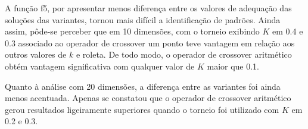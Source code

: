 A função \gls{f5}, por apresentar menos diferença entre os valores de adequação das soluções das variantes, tornou mais difícil a identificação de padrões.
Ainda assim, pôde-se perceber que em 10 dimensões, com o torneio exibindo \( K \) em 0.4 e 0.3 associado ao operador de \gls{crossover} um ponto teve vantagem em relação aos outros valores de \( k \) e roleta.
De todo modo, o operador de \gls{crossover} aritmético obtém vantagem significativa com qualquer valor de \( K \) maior que 0.1.

Quanto à análise com 20 dimensões, a diferença entre as variantes foi ainda menos acentuada.
Apenas se constatou que o operador de \gls{crossover} aritmético gerou resultados ligeiramente superiores quando o torneio foi utilizado com \( K \) em 0.2 e 0.3.